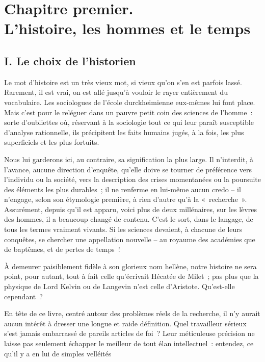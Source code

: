 \documentclass[french,twoside]{book} %
\begin{document}
\section[{Chapitre premier. L’histoire, les hommes et le temps}]{Chapitre premier. \\
L’histoire, les hommes et le temps}\renewcommand{\leftmark}{Chapitre premier. \\
L’histoire, les hommes et le temps}

\subsection[{I. Le choix de l’historien}]{I. Le choix de l’historien}
\noindent  {}
\label{p1} Le mot d’histoire est un très vieux mot, si vieux qu’on s’en est parfois lassé. Rarement, il est vrai, on est allé jusqu’à vouloir le rayer entièrement du vocabulaire. Les sociologues de l’école durckheimienne eux‑mêmes lui font place. Mais c’est pour le reléguer dans un pauvre petit coin des sciences de l’homme : sorte d’oubliettes où, réservant à la sociologie tout ce qui leur paraît susceptible d’analyse rationnelle, ils précipitent les faits humains jugés, à la fois, les plus superficiels et les plus fortuits.\par
Nous lui garderons ici, au contraire, sa signification la plus large. Il n’interdit, à l’avance, aucune direction d’enquête, qu’elle doive se tourner de préférence vers l’individu ou la société, vers la description des crises momentanées ou la poursuite des éléments les plus durables ; il ne renferme en lui-même aucun credo – il n’engage, selon son étymologie première, à rien d’autre qu’à la « recherche ». Assurément, depuis qu’il est apparu, voici plus de deux millénaires, sur les lèvres des hommes, il a beaucoup changé de contenu. C’est le sort, dans le langage, de tous les termes vrai­ment vivants. Si les sciences devaient, à chacune de leurs conquêtes, se chercher une appellation nouvelle – au royaume des académies que de baptêmes, et de pertes de temps !\par
À demeurer paisiblement fidèle à son glorieux nom hellène, notre histoire ne sera point, pour autant, tout à fait celle qu’écrivait Hécatée de Milet ; pas plus que la physique de Lord Kelvin ou de Langevin n’est celle d’Aristote. Qu’est‑elle cependant ?\par
En tête de ce livre, centré autour des problèmes réels de la recherche, il n’y aurait aucun intérêt à dresser une longue et raide définition. Quel travailleur sérieux s’est jamais embarrassé de pareils articles de foi ? Leur méticuleuse précision ne laisse pas seulement échapper le meilleur de tout élan intellectuel : entendez, ce qu’il y a en lui de simples velléités  
\end{document}
